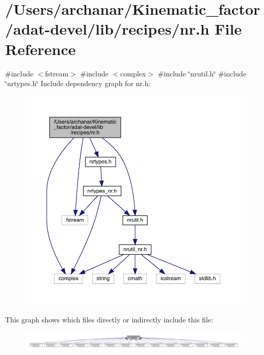 \hypertarget{adat-devel_2lib_2recipes_2nr_8h}{}\section{/\+Users/archanar/\+Kinematic\+\_\+factor/adat-\/devel/lib/recipes/nr.h File Reference}
\label{adat-devel_2lib_2recipes_2nr_8h}
{\ttfamily \#include $<$fstream$>$}\newline
{\ttfamily \#include $<$complex$>$}\newline
{\ttfamily \#include \char`\"{}nrutil.\+h\char`\"{}}\newline
{\ttfamily \#include \char`\"{}nrtypes.\+h\char`\"{}}\newline
Include dependency graph for nr.\+h\+:
\nopagebreak
\begin{figure}[H]
\begin{center}
\leavevmode
\includegraphics[width=350pt]{dc/da6/adat-devel_2lib_2recipes_2nr_8h__incl}
\end{center}
\end{figure}
This graph shows which files directly or indirectly include this file\+:
\nopagebreak
\begin{figure}[H]
\begin{center}
\leavevmode
\includegraphics[width=350pt]{d9/d99/adat-devel_2lib_2recipes_2nr_8h__dep__incl}
\end{center}
\end{figure}
